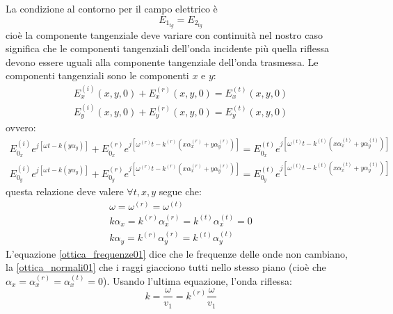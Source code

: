 La condizione al contorno per il campo elettrico è 
\begin{equation}
E_{1_{tg}}=E_{2_{tg}}
\end{equation}
cioè la componente tangenziale deve variare con continuità nel nostro caso significa che le componenti tangenziali dell'onda incidente più quella riflessa devono essere uguali alla componente tangenziale dell'onda trasmessa. Le componenti tangenziali sono le componenti $x$ e $y$:
\begin{subequations}
\begin{gather}
E_x^{(i)}(x,y,0)+E_x^{(r)}(x,y,0)=E_x^{(t)}(x,y,0)\\
E_y^{(i)}(x,y,0)+E_y^{(r)}(x,y,0)=E_y^{(t)}(x,y,0)
\end{gather}
\end{subequations}
ovvero:
\begin{subequations}
\begin{gather}
E^{(i)}_{0_x}e^{j\left[\omega t-k\left(y\alpha_y\right)\right]}+E^{(r)}_{0_x}e^{j\left[\omega^{(r)} t-k^{(r)}(x\alpha_x^{(r)}+y\alpha_y^{(r)})\right]}=E^{(t)}_{0_x}e^{j\left[\omega^{(t)} t-k^{(t)}(x\alpha_x^{(t)}+y\alpha_y^{(t)})\right]}\\
E^{(i)}_{0_y}e^{j\left[\omega t-k\left(y\alpha_y\right)\right]}+E^{(r)}_{0_y}e^{j\left[\omega^{(r)} t-k^{(r)}(x\alpha_x^{(r)}+y\alpha_y^{(r)})\right]}=E^{(t)}_{0_y}e^{j\left[\omega^{(t)} t-k^{(t)}(x\alpha_x^{(t)}+y\alpha_y^{(t)})\right]}
\end{gather}
\label{tante_ottica01}
\end{subequations}
questa relazione deve valere $\forall t,x,y$ segue che:
\begin{subequations}
\begin{gather}
\label{ottica_frequenze01}
\omega=\omega^{(r)}=\omega^{(t)}\\
\label{ottica_normali01}
k\alpha_x=k^{(r)}\alpha_x^{(r)}=k^{(t)}\alpha_x^{(t)}=0\\
k\alpha_y=k^{(r)}\alpha_y^{(r)}=k^{(t)}\alpha_y^{(t)}
\end{gather}
\end{subequations}
L'equazione \eqref{ottica_frequenze01} dice che le frequenze delle onde non cambiano, la \eqref{ottica_normali01} che i raggi giacciono tutti nello stesso piano (cioè che $\alpha_x=\alpha_x^{(r)}=\alpha_x^{(t)}=0$). Usando l'ultima equazione, l'onda riflessa:
\begin{equation*}
k=\frac{\omega}{v_1}=k^{(r)}\frac{\omega}{v_1}
\end{equation*}

